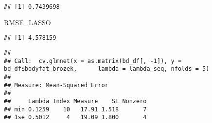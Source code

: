 \documentclass[
]{article}
\newenvironment{Shaded}{\begin{snugshade}}{\end{snugshade}}
\newcommand{\AttributeTok}[1]{\textcolor[rgb]{0.77,0.63,0.00}{#1}}
\newcommand{\DecValTok}[1]{\textcolor[rgb]{0.00,0.00,0.81}{#1}}
\newcommand{\FunctionTok}[1]{\textcolor[rgb]{0.00,0.00,0.00}{#1}}
\newcommand{\NormalTok}[1]{#1}
\newcommand{\OtherTok}[1]{\textcolor[rgb]{0.56,0.35,0.01}{#1}}
\newcommand{\SpecialCharTok}[1]{\textcolor[rgb]{0.00,0.00,0.00}{#1}}
\begin{document}
\begin{verbatim}
## [1] 0.7439698
\end{verbatim}

\begin{Shaded}
\begin{Highlighting}[]
\NormalTok{RMSE\_LASSO}
\end{Highlighting}
\end{Shaded}

\begin{verbatim}
## [1] 4.578159
\end{verbatim}

\begin{Shaded}
\end{Shaded}

\begin{verbatim}
## 
## Call:  cv.glmnet(x = as.matrix(bd_df[, -1]), y = bd_df$bodyfat_brozek,      lambda = lambda_seq, nfolds = 5) 
## 
## Measure: Mean-Squared Error 
## 
##     Lambda Index Measure    SE Nonzero
## min 0.1259    10   17.91 1.518       7
## 1se 0.5012     4   19.09 1.800       4
\end{verbatim}

\begin{Shaded}
\end{Shaded}
\end{document}
